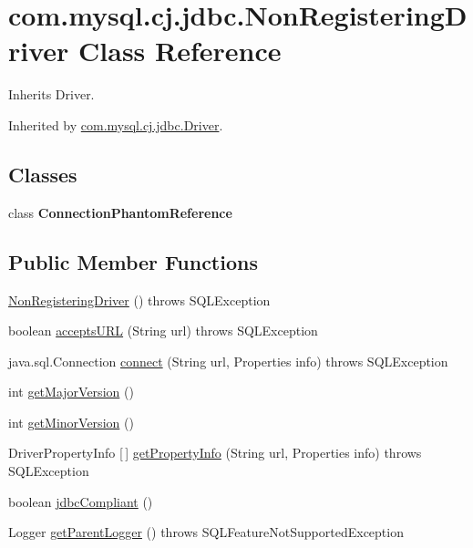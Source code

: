 \hypertarget{classcom_1_1mysql_1_1cj_1_1jdbc_1_1_non_registering_driver}{}\section{com.\+mysql.\+cj.\+jdbc.\+Non\+Registering\+Driver Class Reference}
\label{classcom_1_1mysql_1_1cj_1_1jdbc_1_1_non_registering_driver}


Inherits Driver.



Inherited by \mbox{\hyperlink{classcom_1_1mysql_1_1cj_1_1jdbc_1_1_driver}{com.\+mysql.\+cj.\+jdbc.\+Driver}}.

\subsection*{Classes}
\begin{DoxyCompactItemize}
\item 
class {\bfseries Connection\+Phantom\+Reference}
\end{DoxyCompactItemize}
\subsection*{Public Member Functions}
\begin{DoxyCompactItemize}
\item 
\mbox{\hyperlink{classcom_1_1mysql_1_1cj_1_1jdbc_1_1_non_registering_driver_a43d2c5741a06d37722f12c74d34cad9c}{Non\+Registering\+Driver}} ()  throws S\+Q\+L\+Exception 
\item 
boolean \mbox{\hyperlink{classcom_1_1mysql_1_1cj_1_1jdbc_1_1_non_registering_driver_a647f9685378b944a3c5c6d9f9c47d7f1}{accepts\+U\+RL}} (String url)  throws S\+Q\+L\+Exception 
\item 
java.\+sql.\+Connection \mbox{\hyperlink{classcom_1_1mysql_1_1cj_1_1jdbc_1_1_non_registering_driver_ab3fd3d522550db032eab6c240b554e3e}{connect}} (String url, Properties info)  throws S\+Q\+L\+Exception 
\item 
int \mbox{\hyperlink{classcom_1_1mysql_1_1cj_1_1jdbc_1_1_non_registering_driver_a49801fef4e0494c6b788eab02ed7c30f}{get\+Major\+Version}} ()
\item 
int \mbox{\hyperlink{classcom_1_1mysql_1_1cj_1_1jdbc_1_1_non_registering_driver_a004f3e6c14f4cecb91e1d10cb87f873f}{get\+Minor\+Version}} ()
\item 
Driver\+Property\+Info \mbox{[}$\,$\mbox{]} \mbox{\hyperlink{classcom_1_1mysql_1_1cj_1_1jdbc_1_1_non_registering_driver_ad132531e673998633349a65c4c3eb402}{get\+Property\+Info}} (String url, Properties info)  throws S\+Q\+L\+Exception 
\item 
boolean \mbox{\hyperlink{classcom_1_1mysql_1_1cj_1_1jdbc_1_1_non_registering_driver_a7957fc641b984cf8d56938949be1069d}{jdbc\+Compliant}} ()
\item 
Logger \mbox{\hyperlink{classcom_1_1mysql_1_1cj_1_1jdbc_1_1_non_registering_driver_a458cfbaed5ad475322ddca7ff3973928}{get\+Parent\+Logger}} ()  throws S\+Q\+L\+Feature\+Not\+Supported\+Exception 
\end{DoxyCompactItemize}
